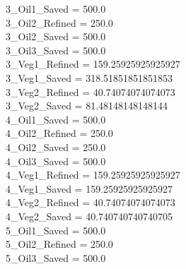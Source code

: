3\_Oil1\_Saved = 500.0\\
3\_Oil2\_Refined = 250.0\\
3\_Oil2\_Saved = 500.0\\
3\_Oil3\_Saved = 500.0\\
3\_Veg1\_Refined = 159.25925925925927\\
3\_Veg1\_Saved = 318.51851851851853\\
3\_Veg2\_Refined = 40.74074074074073\\
3\_Veg2\_Saved = 81.48148148148144\\
4\_Oil1\_Saved = 500.0\\
4\_Oil2\_Refined = 250.0\\
4\_Oil2\_Saved = 250.0\\
4\_Oil3\_Saved = 500.0\\
4\_Veg1\_Refined = 159.25925925925927\\
4\_Veg1\_Saved = 159.25925925925927\\
4\_Veg2\_Refined = 40.74074074074073\\
4\_Veg2\_Saved = 40.740740740740705\\
5\_Oil1\_Saved = 500.0\\
5\_Oil2\_Refined = 250.0\\
5\_Oil3\_Saved = 500.0\\
